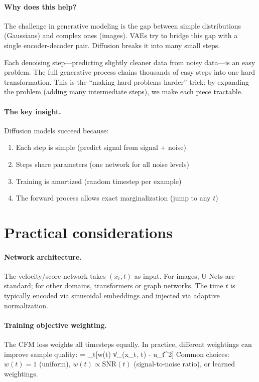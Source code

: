 \documentclass[11pt]{article}
\begin{document}
\paragraph{Why does this help?} The challenge in generative modeling is the gap between simple distributions (Gaussians) and complex ones (images). VAEs try to bridge this gap with a single encoder-decoder pair. Diffusion breaks it into many small steps.

Each denoising step---predicting slightly cleaner data from noisy data---is an easy problem. The full generative process chains thousands of easy steps into one hard transformation. This is the ``making hard problems harder'' trick: by expanding the problem (adding many intermediate steps), we make each piece tractable.

\paragraph{The key insight.} Diffusion models succeed because:
\begin{enumerate}
\item Each step is simple (predict signal from signal + noise)
\item Steps share parameters (one network for all noise levels)
\item Training is amortized (random timestep per example)
\item The forward process allows exact marginalization (jump to any $t$)
\end{enumerate}

\section{Practical considerations}

\paragraph{Network architecture.} The velocity/score network takes $(x_t, t)$ as input. For images, U-Nets are standard; for other domains, transformers or graph networks. The time $t$ is typically encoded via sinusoidal embeddings and injected via adaptive normalization.

\paragraph{Training objective weighting.} The CFM loss weights all timesteps equally. In practice, different weightings can improve sample quality:
\beq
{} = \E_t[w(t) \|v_\theta(x_t, t) - u_t\|^2]
\eeq
Common choices: $w(t) = 1$ (uniform), $w(t) \propto \text{SNR}(t)$ (signal-to-noise ratio), or learned weightings.
\end{document}
